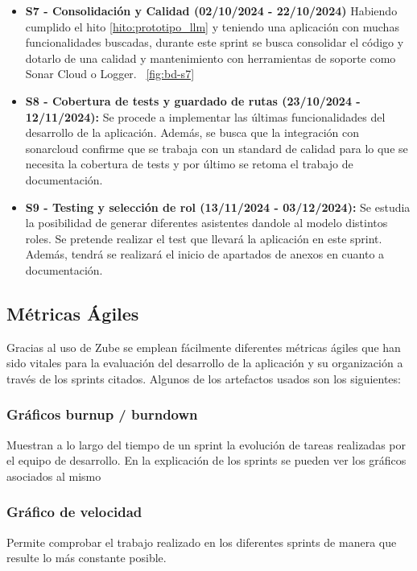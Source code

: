 \begin{itemize}
\item \textbf{S7 - Consolidación y Calidad (02/10/2024 - 22/10/2024)} Habiendo cumplido el hito \ref{hito:prototipo_llm} y teniendo una aplicación con muchas funcionalidades buscadas, durante este sprint se busca consolidar el código y dotarlo de una calidad y mantenimiento con herramientas de soporte como Sonar Cloud o Logger.
~\ref{fig:bd-s7}

\item \textbf{S8 - Cobertura de tests y guardado de rutas (23/10/2024 - 12/11/2024):} Se procede a implementar las últimas funcionalidades del desarrollo de la aplicación. Además, se busca que la integración con sonarcloud confirme que se trabaja con un standard de calidad para lo que se necesita la cobertura de tests y por último se retoma el trabajo de documentación. 

\item \textbf{S9 - Testing y selección de rol (13/11/2024 - 03/12/2024):} Se estudia la posibilidad de generar diferentes asistentes dandole al modelo distintos roles. Se pretende realizar el test que llevará la aplicación en este sprint. Además, tendrá se realizará el inicio de apartados de anexos en cuanto a documentación. 

\end{itemize}

\subsection{Métricas Ágiles}
Gracias al uso de Zube se emplean fácilmente diferentes métricas ágiles que han sido vitales para la evaluación del desarrollo de la aplicación y su organización a través de los sprints citados. Algunos de los artefactos usados son los siguientes:
\subsubsection{Gráficos burnup / burndown} 
Muestran a lo largo del tiempo de un sprint la evolución de tareas realizadas por el equipo de desarrollo. En la explicación de los sprints se pueden ver los gráficos asociados al mismo
\subsubsection{Gráfico de velocidad} 
Permite comprobar el trabajo realizado en los diferentes sprints de manera que resulte lo más constante posible.


